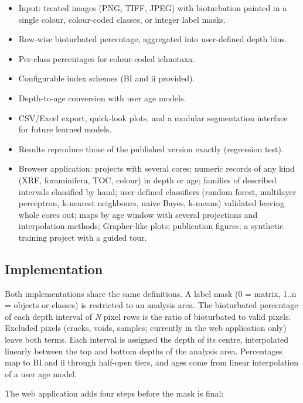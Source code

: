 \documentclass[
  10pt,
]{article}
\providecommand{\tightlist}{%
  \setlength{\itemsep}{0pt}\setlength{\parskip}{0pt}}
\begin{document}
\begin{itemize}
\tightlist
\item
  Input: treated images (PNG, TIFF, JPEG) with bioturbation painted in a
  single colour, colour-coded classes, or integer label masks.
\item
  Row-wise bioturbated percentage, aggregated into user-defined depth
  bins.
\item
  Per-class percentages for colour-coded ichnotaxa.
\item
  Configurable index schemes (BI and ii provided).
\item
  Depth-to-age conversion with user age models.
\item
  CSV/Excel export, quick-look plots, and a modular segmentation
  interface for future learned models.
\item
  Results reproduce those of the published version exactly (regression
  test).
\item
  Browser application: projects with several cores; numeric records of
  any kind (XRF, foraminifera, TOC, colour) in depth or age; families of
  described intervals classified by hand; user-defined classifiers
  (random forest, multilayer perceptron, k-nearest neighbours, naive
  Bayes, k-means) validated leaving whole cores out; maps by age window
  with several projections and interpolation methods; Grapher-like
  plots; publication figures; a synthetic training project with a guided
  tour.
\end{itemize}

\hypertarget{implementation}{%
\subsection{Implementation}\label{implementation}}

Both implementations share the same definitions. A label mask (0 =
matrix, 1..n = objects or classes) is restricted to an analysis area.
The bioturbated percentage of each depth interval of \emph{N} pixel rows
is the ratio of bioturbated to valid pixels. Excluded pixels (cracks,
voids, samples; currently in the web application only) leave both terms.
Each interval is assigned the depth of its centre, interpolated linearly
between the top and bottom depths of the analysis area. Percentages map
to BI and ii through half-open tiers, and ages come from linear
interpolation of a user age model.

The web application adds four steps before the mask is final:
\end{document}
